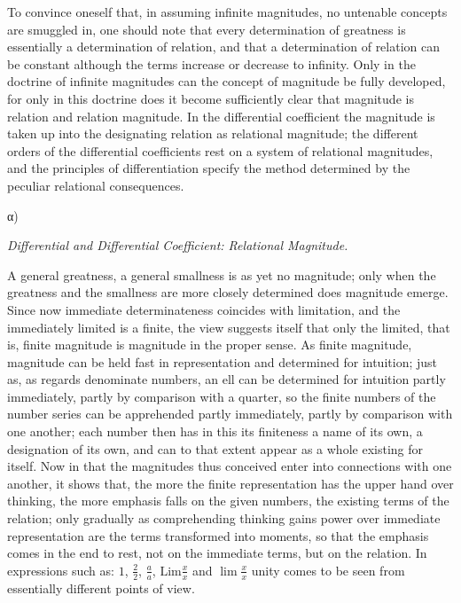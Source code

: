 \documentclass[12pt,a4paper,openany]{book}
\newcommand{\opage}[1]{\marginnote{\footnotesize\textit{[#1]}}}
\begin{document}
To convince oneself that, in assuming
infinite magnitudes, no untenable concepts are smuggled in,
one should note that every determination of greatness is essentially
a determination of relation, and that a determination of relation
can be constant although the terms increase or decrease
to infinity. Only in the doctrine of infinite magnitudes
can the concept of magnitude be fully developed, for only in this
doctrine does it become sufficiently clear that magnitude is relation
and relation magnitude. In the differential coefficient the %
magnitude is taken up into the designating relation as
\setcounter{footnote}{0}%
\opage{78}relational magnitude; the different orders of the differential coefficients rest %
on a system of relational magnitudes, and the principles of differentiation
specify the method determined by the peculiar relational consequences.

\begin{center}α)

\emph{Differential and Differential Coefficient: Relational Magnitude.}\end{center}

A general greatness, a general smallness is
as yet no magnitude; only when the greatness and the smallness
are more closely determined does magnitude emerge. Since now
immediate determinateness coincides with limitation,
and the immediately limited is a finite, the view suggests itself
that only the limited, that is, finite magnitude
is magnitude in the proper sense. As
finite magnitude, magnitude can be held fast in representation
and determined for intuition; just as, as regards denominate numbers,
an ell can be determined for intuition partly immediately,
partly by comparison with a quarter, so the finite numbers of the number series can be apprehended partly immediately,
partly by comparison with one another;
each number then has in this its finiteness a name of its own, a designation of its own, %
and can to that extent appear as a whole existing
for itself. Now in that the magnitudes thus conceived
enter into connections with one another, it shows that, the
more the finite representation has the upper hand over thinking,
the more emphasis falls on the given numbers,
the existing terms of the relation; only gradually as comprehending
thinking gains power over immediate representation
are the terms transformed into moments, so that the emphasis
comes in the end to rest, not on the immediate
terms, but on the relation. In expressions such as: $1$, $\frac{2}{2}$, $\frac{a}{a}$, $\mathrm{Lim}\frac{x}{x}$
and $\lim\frac{x}{x}$ unity comes to be seen from essentially different
points of view.
\end{document}
